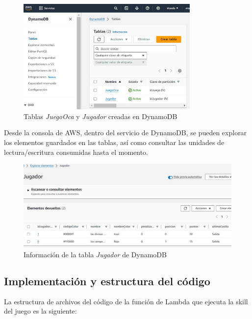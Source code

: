 \begin{figure}[H]
	\centering
	\includegraphics[width=0.8\textwidth]{imgs/aws-db-1.jpg}
	\caption{Tablas \textit{JuegoOca} y \textit{Jugador} creadas en DynamoDB}
	\label{fig:aws-db-1}
\end{figure}

Desde la consola de AWS, dentro del servicio de DynamoDB, se pueden explorar los elementos guardados en las tablas, así como consultar las unidades de lectura/escritura consumidas hasta el momento.

\begin{figure}[H]
	\centering
	\includegraphics[width=1\textwidth]{imgs/aws-db-2.jpg}
	\caption{Información de la tabla \textit{Jugador} de DynamoDB}
	\label{fig:aws-db-2}
\end{figure}

\subsection{Implementación y estructura del código}

La estructura de archivos del código de la función de Lambda que ejecuta la skill del juego es la siguiente:

